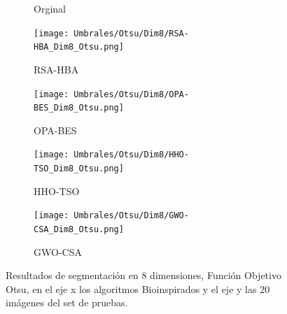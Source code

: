 \documentclass[conference]{IEEEtran}
\begin{document}
\begin{figure}[!htb]
\begin{subfigure}[b]{0.13\textwidth}
		\caption{Orginal}
		\label{fig:imgOrginal}
	\end{subfigure}
	\begin{subfigure}[b]{0.13\textwidth}
		\texttt{[image: Umbrales/Otsu/Dim8/RSA-HBA\_Dim8\_Otsu.png]}
		\caption{RSA-HBA}
		\label{fig:imagen1}
	\end{subfigure}
	\begin{subfigure}[b]{0.13\textwidth}
		\texttt{[image: Umbrales/Otsu/Dim8/OPA-BES\_Dim8\_Otsu.png]}
		\caption{OPA-BES}
		\label{fig:imagen2}
	\end{subfigure}
	\begin{subfigure}[b]{0.13\textwidth}
		\texttt{[image: Umbrales/Otsu/Dim8/HHO-TSO\_Dim8\_Otsu.png]}
		\caption{HHO-TSO}
		\label{fig:imagen2}
	\end{subfigure}
	\begin{subfigure}[b]{0.13\textwidth}
		\texttt{[image: Umbrales/Otsu/Dim8/GWO-CSA\_Dim8\_Otsu.png]}
		\caption{GWO-CSA}
		\label{fig:imagen2}
	\end{subfigure}
	
	
	\caption{Resultados de segmentación en 8 dimensiones, Función Objetivo Otsu, en el eje x los algoritmos Bioinspirados y el eje y las 20 imágenes del set de pruebas.}
	\label{fig:resultados7dim}
\end{figure}
\end{document}
